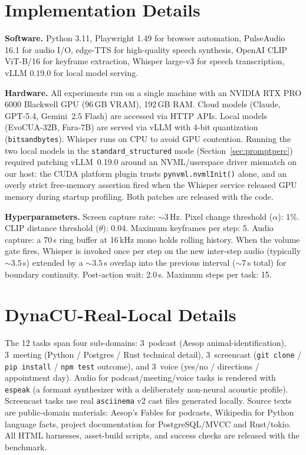 \documentclass[11pt]{article}
\begin{document}
\section{Implementation Details}
\label{app:implementation}

\textbf{Software.}
Python 3.11, Playwright 1.49 for browser automation, PulseAudio 16.1 for audio I/O, edge-TTS for high-quality speech synthesis, OpenAI CLIP ViT-B/16 for keyframe extraction, Whisper large-v3 for speech transcription, vLLM 0.19.0 for local model serving.

\textbf{Hardware.}
All experiments run on a single machine with an NVIDIA RTX PRO 6000 Blackwell GPU (96\,GB VRAM), 192\,GB RAM.
Cloud models (Claude, GPT-5.4, Gemini~2.5 Flash) are accessed via HTTP APIs.
Local models (EvoCUA-32B, Fara-7B) are served via vLLM with 4-bit quantization (\texttt{bitsandbytes}).
Whisper runs on CPU to avoid GPU contention.
Running the two local models in the \texttt{standard\_structured} mode
(Section~\ref{sec:promptperc}) required patching vLLM~0.19.0 around an
NVML/userspace driver mismatch on our host: the CUDA platform plugin
trusts \texttt{pynvml.nvmlInit()} alone, and an overly strict
free-memory assertion fired when the Whisper service released GPU
memory during startup profiling.  Both patches are released with the
code.

\textbf{Hyperparameters.}
Screen capture rate: ${\sim}3$\,Hz.
Pixel change threshold ($\alpha$): 1\%.
CLIP distance threshold ($\theta$): 0.04.
Maximum keyframes per step: 5.
Audio capture: a 70\,s ring buffer at 16\,kHz mono holds rolling history.
When the volume gate fires, Whisper is invoked once per step on the new
inter-step audio (typically ${\sim}3.5$\,s) extended by a ${\sim}3.5$\,s
overlap into the previous interval (${\sim}7$\,s total) for boundary
continuity.
Post-action wait: 2.0\,s.
Maximum steps per task: 15.

\section{DynaCU-Real-Local Details}
\label{app:realcontent}

The 12 tasks span four sub-domains: 3~podcast (Aesop animal-identification),
3~meeting (Python / Postgres / Rust technical detail), 3~screencast (\texttt{git
clone} / \texttt{pip install} / \texttt{npm test} outcome), and 3~voice
(yes/no / directions / appointment day).
Audio for podcast/meeting/voice tasks is rendered with \texttt{espeak}
(a formant synthesizer with a deliberately non-neural acoustic profile).
Screencast tasks use real \texttt{asciinema} v2 cast files generated locally.
Source texts are public-domain materials: Aesop's Fables for podcasts,
Wikipedia for Python language facts, project documentation for
PostgreSQL/MVCC and Rust/tokio.
All HTML harnesses, asset-build scripts, and success checks are released
with the benchmark.
\end{document}
